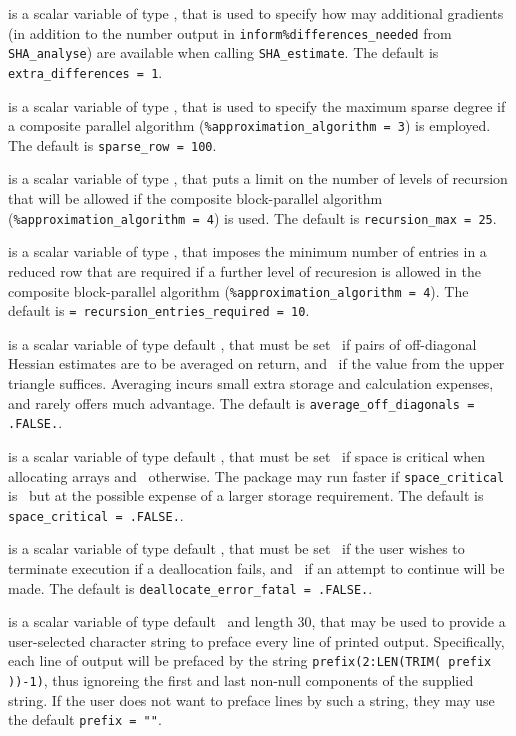\documentclass{galahad}
\newcommand{\packagename}{SHA}
\begin{document}
\begin{description}
 is a scalar variable of type \integer,
that is used to specify how may additional gradients (in addition to the number
output in {\tt inform\%differences\_needed} from {\tt \packagename\_\-analyse})
are available when calling {\tt \packagename\_\-estimate}.
The default is {\tt extra\_differences = 1}.

 is a scalar variable of type \integer,
that is used to specify the maximum sparse degree if a composite
parallel algorithm ({\tt \%approximation\_algorithm = 3}) is employed.
The default is {\tt sparse\_row = 100}.

 is a scalar variable of type \integer, that puts a limit
on the number of levels of recursion that will be allowed if the
composite block-parallel algorithm ({\tt \%approximation\_algorithm = 4}) is
used.
The default is {\tt recursion\_max  = 25}.

 is a scalar variable of type \integer,
that imposes the minimum number of entries in a reduced row that are required
if a further level of recuresion is allowed in the composite block-parallel
algorithm ({\tt \%approximation\_algorithm = 4}).
The default is {\tt  = recursion\_entries\_required = 10}.

 is a scalar variable of type default \logical,
that must be set \true\ if pairs of off-diagonal Hessian estimates are 
to be averaged on return, and \false\ if the value from the upper triangle
suffices. Averaging incurs small extra storage and calculation 
expenses, and rarely offers much advantage.
The default is {\tt average\_off\_diagonals = .FALSE.}.

 is a scalar variable of type default \logical,
that must be set \true\ if space is critical when allocating arrays
and  \false\ otherwise. The package may run faster if
{\tt space\_critical} is \false\ but at the possible expense of a larger
storage requirement. The default is {\tt space\_critical = .FALSE.}.

 is a scalar variable of type default \logical,
that must be set \true\ if the user wishes to terminate execution if
a deallocation  fails, and \false\ if an attempt to continue
will be made. The default is {\tt deallocate\_error\_fatal = .FALSE.}.

 is a scalar variable of type default \character\
and length 30, that may be used to provide a user-selected
character string to preface every line of printed output.
Specifically, each line of output will be prefaced by the string
{\tt prefix(2:LEN(TRIM( prefix ))-1)},
thus ignoreing the first and last non-null components of the
supplied string. If the user does not want to preface lines by such
a string, they may use the default {\tt prefix = ""}.

\end{description}
\end{document}
